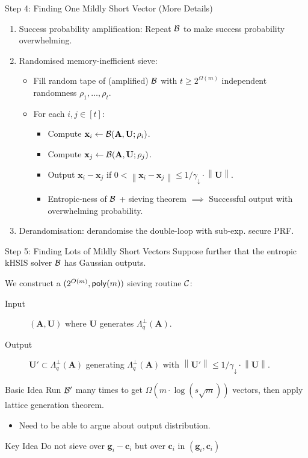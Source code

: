 \documentclass[xcolor=table,10pt,aspectratio=169]{beamer}
\renewcommand{\vec}[1]{\ensuremath{\mathbf{#1}}\xspace}
\newcommand{\norm}[1]{\left\lVert#1\right\rVert}
\providecommand{\mat}[1]{\ensuremath{\vec{#1}}\xspace}
\newcommand{\shrinkfactor}{\gamma_{\downarrow}}
\begin{document}
\begin{frame}[label={sec:orgfc84649}]{Step 4: Finding One Mildly Short Vector (More Details)}
\begin{enumerate}
\item Success probability amplification: Repeat \(\mathcal{B}\) to make success probability overwhelming.
\item Randomised memory-inefficient sieve:
\begin{itemize}
\item Fill random tape of (amplified) \(\mathcal{B}\) with \(t \geq 2^{\Omega(m)}\) independent randomness \(\rho_1, \ldots, \rho_t\).
\item For each \(i,j \in [t]\):
\begin{itemize}
\item Compute \(\vec{x}_i \gets \bdv(\mat{A}, \mat{U}; \rho_i)\).
\item Compute \(\vec{x}_j \gets \bdv(\mat{A}, \mat{U}; \rho_j)\).
\item Output \(\vec{x}_i - \vec{x}_j\) if \(0 < \norm{\vec{x}_i - \vec{x}_j} \leq 1/\shrinkfactor \cdot \norm{\mat{U}}.\)
\item Entropic-ness of \(\mathcal{B}\) + sieving theorem \(\implies\) Successful output with overwhelming probability.
\end{itemize}
\end{itemize}
\item Derandomisation: derandomise the double-loop with sub-exp. secure PRF.
\end{enumerate}
\end{frame}

\begin{frame}[label={sec:orge20e686}]{Step 5: Finding Lots of Mildly Short Vectors}
Suppose further that the entropic kHSIS solver \(\mathcal{B}\) has Gaussian outputs.

We construct a \((2^{O(m)}, \poly[m])\) sieving routine \(\mathcal{C}\):

\begin{description}
\item[{Input}] \((\mat{A}, \mat{U})\) where \(\mat{U}\) generates \(\Lambda_q^\bot(\mat{A})\).
\item[{Output}] \(\mat{U}' \subset \Lambda_q^\bot(\mat{A})\) generating \(\Lambda_q^\bot(\mat{A})\) with \(\norm{\mat{U}'} \leq 1/\shrinkfactor \cdot \norm{\mat{U}}\).
\end{description}

\begin{block}{Basic Idea}
Run \(\mathcal{B}'\) many times to get \(\Omega(m \cdot \log(s \sqrt{m}))\) vectors, then apply lattice generation theorem.
\end{block}

\begin{itemize}
\item Need to be able to argue about output distribution.
\end{itemize}

\begin{alertblock}{Key Idea}
Do not sieve over \(\vec{g}_{i} - \vec{c}_{i}\) but over \(\vec{c}_{i}\) in \((\vec{g}_{i}, \vec{c}_{i})\)
\end{alertblock}
\end{frame}
\end{document}
